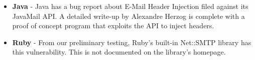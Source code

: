 \begin{itemize}
\item{\textbf{Java}} -
Java has a bug report about E-Mail Header Injection filed against its JavaMail API. A detailed write-up by Alexandre Herzog \cite{Herzog.2014} is complete with a proof of concept program that exploits the API to inject headers.

\item{\textbf{Ruby}} -
From our preliminary testing, Ruby's built-in Net::SMTP library has this vulnerability. This is not documented on the library's homepage.

%

\end{itemize}